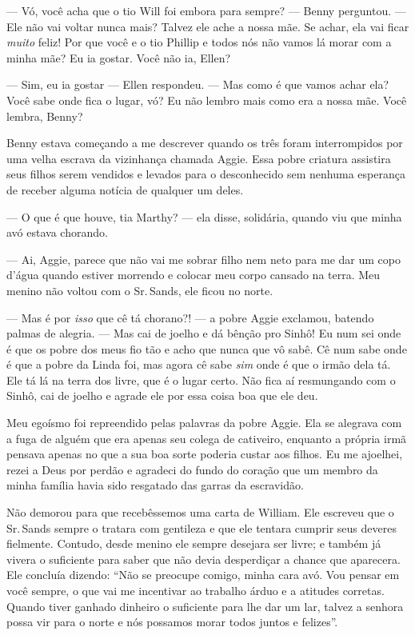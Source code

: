 --- Vó, você acha que o tio Will foi embora para sempre? --- Benny
perguntou. --- Ele não vai voltar nunca mais? Talvez ele ache a nossa
mãe. Se achar, ela vai ficar \emph{muito} feliz! Por que você e o tio
Phillip e todos nós não vamos lá morar com a minha mãe? Eu ia gostar.
Você não ia, Ellen?

--- Sim, eu ia gostar --- Ellen
respondeu. --- Mas como é que vamos achar ela? Você sabe onde fica o
lugar, vó? Eu não lembro mais como era a nossa mãe. Você lembra, Benny?

Benny estava começando a me descrever
quando os três foram interrompidos por uma velha escrava da vizinhança
chamada Aggie. Essa pobre criatura assistira seus filhos serem vendidos
e levados para o desconhecido sem nenhuma esperança de receber alguma
notícia de qualquer um deles.

--- O que é que houve, tia Marthy? --- ela disse, solidária, quando viu
que minha avó estava chorando.

--- Ai, Aggie, parece que não vai me
sobrar filho nem neto para me dar um copo d'água quando estiver morrendo
e colocar meu corpo cansado na terra. Meu menino não voltou com o Sr.\,Sands, ele ficou no norte.

--- Mas é por \emph{isso} que cê tá
chorano?! --- a pobre Aggie exclamou, batendo palmas de alegria. --- Mas
cai de joelho e dá bênção pro Sinhô! Eu num sei onde é que os pobre dos
meus fio tão e acho que nunca que vô sabê. Cê num sabe onde é que a
pobre da Linda foi, mas agora cê sabe \emph{sim} onde é que o irmão dela
tá. Ele tá lá na terra dos livre, que é o lugar certo. Não fica aí
resmungando com o Sinhô, cai de joelho e agrade ele por essa coisa boa
que ele deu.

Meu egoísmo foi repreendido pelas
palavras da pobre Aggie. Ela se alegrava com a fuga de alguém que era
apenas seu colega de cativeiro, enquanto a própria irmã pensava apenas
no que a sua boa sorte poderia custar aos filhos. Eu me ajoelhei, rezei
a Deus por perdão e agradeci do fundo do coração que um membro da minha
família havia sido resgatado das garras da escravidão.

Não demorou para que recebêssemos uma
carta de William. Ele escreveu que o Sr.\,Sands sempre o tratara com
gentileza e que ele tentara cumprir seus deveres fielmente. Contudo,
desde menino ele sempre desejara ser livre; e também já vivera o
suficiente para saber que não devia desperdiçar a chance que aparecera.
Ele concluía dizendo: ``Não se preocupe comigo, minha cara avó. Vou
pensar em você sempre, o que vai me incentivar ao trabalho árduo e a
atitudes corretas. Quando tiver ganhado dinheiro o suficiente para lhe
dar um lar, talvez a senhora possa vir para o norte e nós possamos morar
todos juntos e felizes''.

